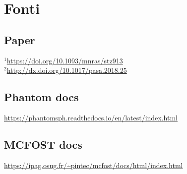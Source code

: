\documentclass[DIN, pagenumber=false, fontsize=11pt, parskip=half]{scrartcl}
\begin{document}
\section{Fonti}

\subsection{Paper}
\label{source}
 $^1$\url{https://doi.org/10.1093/mnras/stz913} \\
 $^2$\url{http://dx.doi.org/10.1017/pasa.2018.25}
\subsection{Phantom docs}
\url{https://phantomsph.readthedocs.io/en/latest/index.html}

\subsection{MCFOST docs}
\url{https://ipag.osug.fr/~pintec/mcfost/docs/html/index.html}
\end{document}
